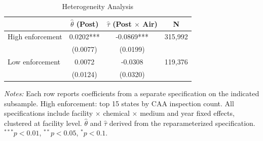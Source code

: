 \begin{table}[htbp]
\centering
\caption{Heterogeneity Analysis}
\label{tab:heterogeneity}
\begin{tabular}{lccc}
\toprule
& $\hat{\theta}$ (Post) & $\hat{\tau}$ (Post $\times$ Air) & N \\
\midrule
High enforcement & 0.0202*** & -0.0869*** & 315,992 \\
& (0.0077) & (0.0199) & \\[3pt]
Low enforcement & 0.0072 & -0.0308 & 119,376 \\
& (0.0124) & (0.0320) & \\
\bottomrule
\end{tabular}
\begin{minipage}{0.95\textwidth}
\vspace{0.3em}
\footnotesize \textit{Notes:} Each row reports coefficients from a separate specification on the indicated subsample. High enforcement: top 15 states by CAA inspection count. All specifications include facility $\times$ chemical $\times$ medium and year fixed effects, clustered at facility level. $\hat{\theta}$ and $\hat{\tau}$ derived from the reparameterized specification. $^{***}p<0.01$, $^{**}p<0.05$, $^{*}p<0.1$.
\end{minipage}
\end{table}
